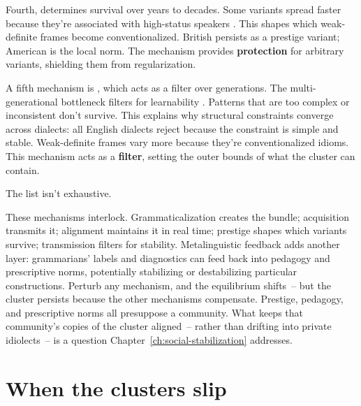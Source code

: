 Fourth,  determines survival over years to decades. Some variants spread faster because they're associated with high-status speakers \citep{labov2001}. This shapes which weak-definite frames become conventionalized. British  persists as a prestige variant; American  is the local norm. The mechanism provides \textbf{protection} for arbitrary variants, shielding them from regularization.

A fifth mechanism is , which acts as a filter over generations. The multi-generational bottleneck filters for learnability \citep{kirby2014}. Patterns that are too complex or inconsistent don't survive. This explains why structural constraints converge across dialects: all English dialects reject  because the constraint is simple and stable. Weak-definite frames vary more because they're conventionalized idioms. This mechanism acts as a \textbf{filter}, setting the outer bounds of what the cluster can contain.

The list isn't exhaustive. 

These mechanisms interlock. Grammaticalization creates the bundle; acquisition transmits it; alignment maintains it in real time; prestige shapes which variants survive; transmission filters for stability. Metalinguistic feedback adds another layer: grammarians' labels and diagnostics can feed back into pedagogy and prescriptive norms, potentially stabilizing or destabilizing particular constructions. Perturb any mechanism, and the equilibrium shifts~-- but the cluster persists because the other mechanisms compensate. Prestige, pedagogy, and prescriptive norms all presuppose a community. What keeps that community's copies of the cluster aligned~-- rather than drifting into private idiolects~-- is a question Chapter~\ref{ch:social-stabilization} addresses.

\section{When the clusters slip}
\label{sec:10:slippage}

